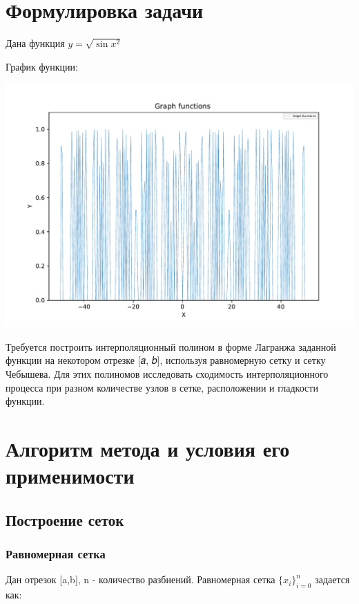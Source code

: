 






\section{Формулировка задачи}

Дана функция 
\begin{math} 
	y=\sqrt{\sin{x^{2}}}
\end{math}

График функции:

\includegraphics[scale=0.9]{graph.pdf}

Требуется построить интерполяционный полином в форме Лагранжа заданной функции на некотором отрезке [𝑎, 𝑏], используя равномерную сетку и сетку Чебышева. Для этих полиномов исследовать сходимость интерполяционного процесса при разном количестве узлов в сетке, расположении и гладкости функции. 

\section{Алгоритм метода и условия его применимости}

\subsection{Построение сеток}
\subsubsection{Равномерная сетка}
Дан отрезок [a,b], n - количество разбиений. Равномерная сетка 
\begin{math} 
	\{x_{i}\}_{i=0}^{n}
\end{math}
 задается как: 

